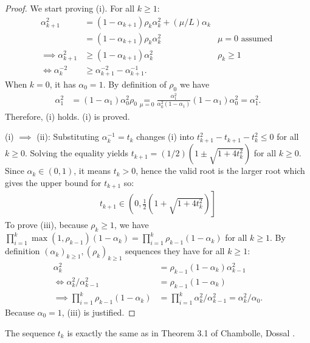 \documentclass[12pt]{article}
\begin{document}
    \begin{proof}
        We start proving (i). 
        For all $k \ge 1$: 
        \begin{align*}
            \alpha_{k + 1}^2 
            &= (1 - \alpha_{k + 1})\rho_k\alpha_k^2 + (\mu/L) \alpha_k
            \\
            &= (1 - \alpha_{k + 1})\rho_k\alpha_k^2 & \mu = 0 \text{ assumed } 
            \\
            \implies 
            \alpha_{k + 1}^2 
            & \ge (1 - \alpha_{k + 1})\alpha_k^2 
            &  \rho_k \ge 1
            \\
            \iff 
            \alpha_k^{-2} 
            &\ge 
            \alpha_{k + 1}^{-2} - \alpha_{k + 1}^{-1}. 
        \end{align*}
        When $k = 0$, it has $\alpha_0 = 1$. 
        By definition of $\rho_0$ we have 
        \begin{align*}
            \alpha_1^2 &= 
            (1 - \alpha_1)\alpha_0^2\rho_0 \underset{\mu = 0}{=}
            \frac{\alpha_1^2}{\alpha_0^2(1 - \alpha_1)}(1 - \alpha_1)\alpha_0^2 = \alpha_1^2. 
        \end{align*}
        Therefore, (i) holds. 
        (i) is proved. 
        \par
        (i) $\implies$ (ii): Substituting $\alpha_k^{-1} = t_k$ changes (i) into $t_{k + 1}^2 - t_{k + 1} - t_{k}^2 \le 0$ for all $k \ge 0$. 
        Solving the equality yields $t_{k + 1} = (1/2)\left(1 \pm \sqrt{1 + 4 t_k^2}\right)$ for all $k \ge 0$. 
        Since $\alpha_k \in (0, 1)$, it means $t_k > 0$, hence the valid root is the larger root which gives the upper bound for $t_{k + 1}$ so: 
        \begin{align*}
            t_{k + 1} \in \left(
                0, \frac{1}{2}\left(1 + \sqrt{1 + 4t_k^2}\right) 
            \right]
        \end{align*}
        To prove (iii), because $\rho_k \ge 1$, we have $\prod_{i = 1}^{k} \max(1, \rho_{k - 1})(1 - 
        \alpha_k)= \prod_{i = 1}^{k}\rho_{k - 1}(1 - \alpha_k)$ for all $k \ge 1 $. 
        By definition $(\alpha_k)_{k \ge 1}, (\rho_k)_{k \ge 1}$ sequences they have for all $k \ge 1$: 
        \begin{align*}
            \alpha_k^2 &= \rho_{k - 1}(1 - \alpha_k)\alpha_{k - 1}^2
            \\
            \iff 
            \alpha_k^2/\alpha_{k - 1}^2 &= \rho_{k - 1}(1 - \alpha_k)
            \\
            \implies 
            \prod_{i = 1}^{k}\rho_{k - 1}(1 - \alpha_k)
            &= 
            \prod_{i = 1}^{k}\alpha_k^2 /\alpha_{k - 1}^2= \alpha_k^2/\alpha_0. 
        \end{align*}
        Because $\alpha_0 = 1$, (iii) is justified. 
    \end{proof}
    \begin{remark}
        The sequence $t_k$ is exactly the same as in Theorem 3.1 of Chambolle, Dossal \cite{chambolle_convergence_2015}. 
    \end{remark}
\end{document}
